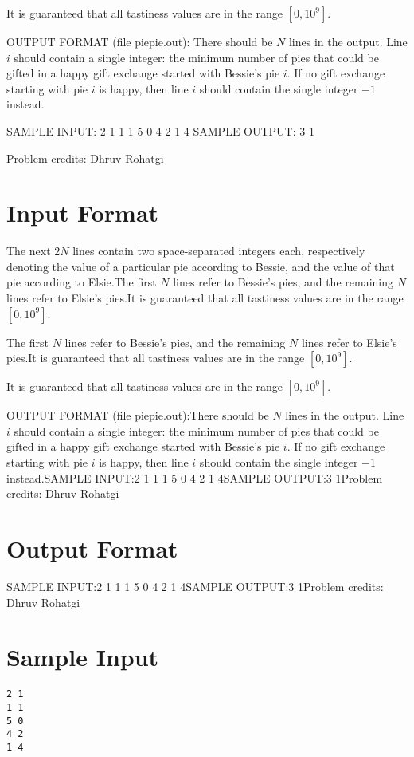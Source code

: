 \documentclass[12pt]{article}
\begin{document}
It is guaranteed that all tastiness values are in the range $[0,10^9]$.


OUTPUT FORMAT (file piepie.out):
There should be $N$ lines in the output. Line $i$ should contain a single
integer: the minimum number of pies that could be gifted in a happy gift
exchange started with Bessie's pie $i$. If no gift exchange starting with pie
$i$ is happy, then line $i$ should contain the single integer $-1$ instead.

SAMPLE INPUT:
2 1
1 1
5 0
4 2
1 4
SAMPLE OUTPUT: 
3
1


Problem credits: Dhruv Rohatgi



\section*{Input Format}
The next $2N$ lines contain two space-separated integers each, respectively
denoting the value of a particular pie according to Bessie, and the value of
that pie according to Elsie.The first $N$ lines refer to Bessie's pies, and the remaining $N$ lines refer to
Elsie's pies.It is guaranteed that all tastiness values are in the range $[0,10^9]$.

The first $N$ lines refer to Bessie's pies, and the remaining $N$ lines refer to
Elsie's pies.It is guaranteed that all tastiness values are in the range $[0,10^9]$.

It is guaranteed that all tastiness values are in the range $[0,10^9]$.

OUTPUT FORMAT (file piepie.out):There should be $N$ lines in the output. Line $i$ should contain a single
integer: the minimum number of pies that could be gifted in a happy gift
exchange started with Bessie's pie $i$. If no gift exchange starting with pie
$i$ is happy, then line $i$ should contain the single integer $-1$ instead.SAMPLE INPUT:2 1
1 1
5 0
4 2
1 4SAMPLE OUTPUT:3
1Problem credits: Dhruv Rohatgi

\section*{Output Format}
SAMPLE INPUT:2 1
1 1
5 0
4 2
1 4SAMPLE OUTPUT:3
1Problem credits: Dhruv Rohatgi

\section*{Sample Input}
\begin{verbatim}
2 1
1 1
5 0
4 2
1 4
\end{verbatim}
\end{document}
